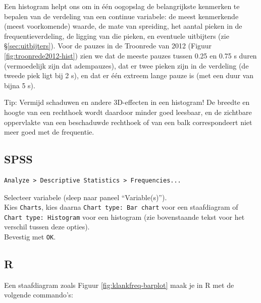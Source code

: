 \documentclass[
]{book}
\begin{document}
Een histogram helpt ons om in één oogopslag de belangrijkste kenmerken
te bepalen van de verdeling van een continue variabele: de meest
kenmerkende (meest voorkomende) waarde, de mate van spreiding, het
aantal pieken in de frequentieverdeling, de ligging van die pieken, en
eventuele uitbijters
(zie §\ref{sec:uitbijters}).
Voor de pauzes in de Troonrede van 2012
(Figuur \ref{fig:troonrede2012-hist}) zien we dat de meeste pauzes
tussen 0.25 en 0.75 s duren (vermoedelijk zijn dat adempauzes), dat er
twee pieken zijn in de verdeling (de tweede piek ligt bij 2 s),
en dat er één extreem lange pauze is (met een duur van bijna 5 s).

Tip: Vermijd schaduwen en andere 3D-effecten in een histogram! De
breedte en hoogte van een rechthoek wordt daardoor minder goed leesbaar,
en de zichtbare oppervlakte van een beschaduwde rechthoek of van een
balk correspondeert niet meer goed met de frequentie.

\hypertarget{spss-2}{%
\subsection{SPSS}\label{spss-2}}

\begin{verbatim}
Analyze > Descriptive Statistics > Frequencies...
\end{verbatim}

Selecteer variabele (sleep naar paneel ``Variable(s)'').\\
Kies \texttt{Charts}, kies daarna \texttt{Chart\ type:\ Bar\ chart} voor een
staafdiagram of \texttt{Chart\ type:\ Histogram} voor een histogram (zie
bovenstaande tekst voor het verschil tussen deze opties).\\
Bevestig met \texttt{OK}.\\

\hypertarget{r-2}{%
\subsection{R}\label{r-2}}

Een staafdiagram zoals Figuur \ref{fig:klankfreq-barplot} maak je in R met de volgende commando's:
\end{document}
